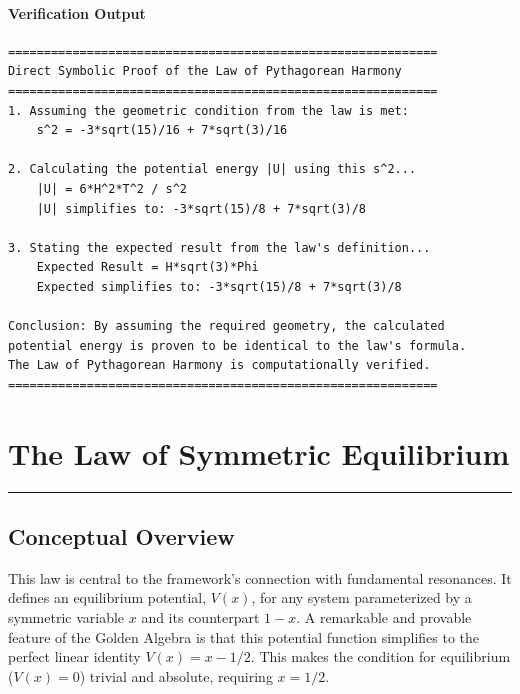 \paragraph{Verification Output}
\begin{verbatim}
============================================================
Direct Symbolic Proof of the Law of Pythagorean Harmony
============================================================
1. Assuming the geometric condition from the law is met:
    s^2 = -3*sqrt(15)/16 + 7*sqrt(3)/16

2. Calculating the potential energy |U| using this s^2...
    |U| = 6*H^2*T^2 / s^2
    |U| simplifies to: -3*sqrt(15)/8 + 7*sqrt(3)/8

3. Stating the expected result from the law's definition...
    Expected Result = H*sqrt(3)*Phi
    Expected simplifies to: -3*sqrt(15)/8 + 7*sqrt(3)/8

Conclusion: By assuming the required geometry, the calculated
potential energy is proven to be identical to the law's formula.
The Law of Pythagorean Harmony is computationally verified.
============================================================
\end{verbatim}


\section{The Law of Symmetric Equilibrium}
\label{sec:symmetric_equilibrium}
\hrule
\vspace{1em}

\vspace{0.5cm}

\subsection*{Conceptual Overview}
This law is central to the framework's connection with fundamental resonances. It defines an equilibrium potential, $V(x)$, for any system parameterized by a symmetric variable $x$ and its counterpart $1-x$. A remarkable and provable feature of the Golden Algebra is that this potential function simplifies to the perfect linear identity $V(x) = x - 1/2$. This makes the condition for equilibrium ($V(x)=0$) trivial and absolute, requiring $x=1/2$.

